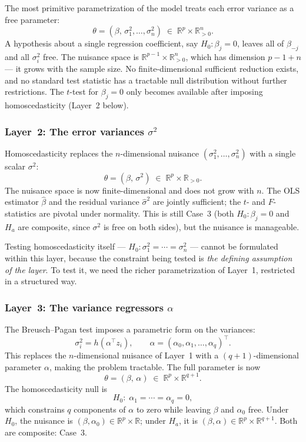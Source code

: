 \documentclass[a4paper,oneside,12pt]{extarticle}
\theoremstyle{plain}
\theoremstyle{definition}
\theoremstyle{remark}
\newcommand*{\mR}{\mathbb{R}}
\begin{document}
The most primitive parametrization of the model treats each error
variance as a free parameter:
\[
  \theta = (\beta,\, \sigma_1^2,\ldots,\sigma_n^2)
  \;\in\; \mR^p \times \mR_{>0}^n.
\]
A hypothesis about a single regression coefficient, say
$H_0: \beta_j = 0$, leaves all of $\beta_{-j}$ and all
$\sigma_i^2$ free.  The nuisance space is $\mR^{p-1} \times
\mR_{>0}^n$, which has dimension $p - 1 + n$ — it grows with
the sample size.  No finite-dimensional sufficient reduction exists,
and no standard test statistic has a tractable null distribution
without further restrictions.  The $t$-test for $\beta_j = 0$
only becomes available after imposing homoscedasticity (Layer~2
below).

\subsubsection*{Layer~2: The error variances $\sigma^2$}

Homoscedasticity replaces the $n$-dimensional nuisance
$(\sigma_1^2,\ldots,\sigma_n^2)$ with a single scalar $\sigma^2$:
\[
  \theta = (\beta,\, \sigma^2)
  \;\in\; \mR^p \times \mR_{>0}.
\]
The nuisance space is now finite-dimensional and does not grow
with $n$.  The OLS estimator $\hat\beta$ and the residual
variance $\hat\sigma^2$ are jointly sufficient; the $t$- and
$F$-statistics are pivotal under normality.  This is still
Case~3 (both $H_0: \beta_j = 0$ and $H_a$ are composite, since
$\sigma^2$ is free on both sides), but the nuisance is manageable.

Testing homoscedasticity itself — $H_0: \sigma_1^2 = \cdots =
\sigma_n^2$ — cannot be formulated within this layer, because the
constraint being tested is \emph{the defining assumption of the
layer}.  To test it, we need the richer parametrization of
Layer~1, restricted in a structured way.

\subsubsection*{Layer~3: The variance regressors $\alpha$}

The Breusch--Pagan test imposes a parametric form on the variances:
\[
  \sigma_i^2 = h(\alpha^\top z_i),
  \qquad
  \alpha = (\alpha_0,\alpha_1,\ldots,\alpha_q)^\top.
\]
This replaces the $n$-dimensional nuisance of Layer~1 with a
$(q+1)$-dimensional parameter $\alpha$, making the problem
tractable.  The full parameter is now
\[
  \theta = (\beta,\, \alpha)
  \;\in\; \mR^p \times \mR^{q+1}.
\]
The homoscedasticity null is
\[
  H_0:\; \alpha_1 = \cdots = \alpha_q = 0,
\]
which constrains $q$ components of $\alpha$ to zero while
leaving $\beta$ and $\alpha_0$ free.  Under $H_0$, the
nuisance is $(\beta, \alpha_0) \in \mR^p \times \mR$; under
$H_a$, it is $(\beta, \alpha) \in \mR^p \times \mR^{q+1}$.
Both are composite: Case~3.
\end{document}
